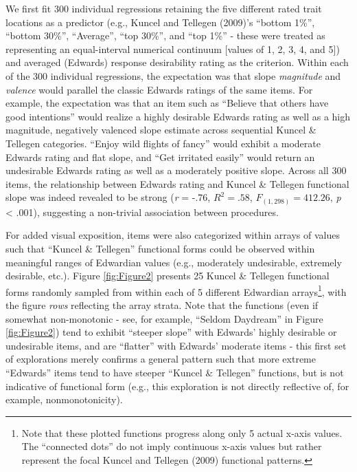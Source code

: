 \documentclass[
  ,jou]{apa6}
\begin{document}
We first fit 300 individual regressions retaining the five different rated trait locations as a predictor (e.g., Kuncel and Tellegen (2009)'s ``bottom 1\%'', ``bottom 30\%'', ``Average'', ``top 30\%'', and ``top 1\%'' - these were treated as representing an equal-interval numerical continuum {[}values of 1, 2, 3, 4, and 5{]}) and averaged (Edwards) response desirability rating as the criterion. Within each of the 300 individual regressions, the expectation was that slope \emph{magnitude} and \emph{valence} would parallel the classic Edwards ratings of the same items. For example, the expectation was that an item such as ``Believe that others have good intentions'' would realize a highly desirable Edwards rating as well as a high magnitude, negatively valenced slope estimate across sequential Kuncel \& Tellegen categories. ``Enjoy wild flights of fancy'' would exhibit a moderate Edwards rating and flat slope, and ``Get irritated easily'' would return an undesirable Edwards rating as well as a moderately positive slope. Across all 300 items, the relationship between Edwards rating and Kuncel \& Tellegen functional slope was indeed revealed to be strong (\emph{r} = -.76, \(R^2 = .58\), \(F_{(1,298)} = 412.26\), \emph{p} \textless{} .001), suggesting a non-trivial association between procedures.

For added visual exposition, items were also categorized within arrays of values such that ``Kuncel \& Tellegen'' functional forms could be observed within meaningful ranges of Edwardian values (e.g., moderately undesirable, extremely desirable, etc.). Figure \ref{fig:Figure2} presents 25 Kuncel \& Tellegen functional forms randomly sampled from within each of 5 different Edwardian arrays\footnote{Note that these plotted functions progress along only 5 actual x-axis values. The ``connected dots'' do not imply continuous x-axis values but rather represent the focal Kuncel and Tellegen (2009) functional patterns.}, with the figure \emph{rows} reflecting the array strata. Note that the functions (even if somewhat non-monotonic - see, for example, ``Seldom Daydream'' in Figure \ref{fig:Figure2}) tend to exhibit ``steeper slope'' with Edwards' highly desirable or undesirable items, and are ``flatter'' with Edwards' moderate items - this first set of explorations merely confirms a general pattern such that more extreme ``Edwards'' items tend to have steeper ``Kuncel \& Tellegen'' functions, but is not indicative of functional form (e.g., this exploration is not directly reflective of, for example, nonmonotonicity).
\end{document}
